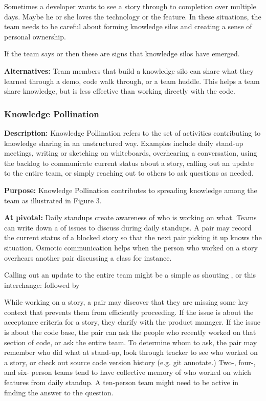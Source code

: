 Sometimes a developer wants to see a story through to completion over multiple days. Maybe he or she loves the technology or the feature. In these situations, the team needs to be careful about forming knowledge silos and creating a sense of personal ownership.

If the team says  or  then these are signs that knowledge silos have emerged. 

\textbf{Alternatives:} Team members that build a knowledge silo can share what they learned through a demo, code walk through, or a team huddle. This helps a team share knowledge, but is less effective than working directly with the code. 

\subsubsection{Knowledge Pollination}
\textbf{Description:} Knowledge Pollination refers to the set of activities contributing to knowledge sharing in an unstructured way. Examples include daily stand-up meetings, writing or sketching on whiteboards, overhearing a conversation, using the backlog to communicate current status about a story, calling out an update to the entire team, or simply reaching out to others to ask questions as needed. 

\textbf{Purpose:} Knowledge Pollination contributes to spreading knowledge among the team as illustrated in Figure 3.

\textbf{At pivotal:} Daily standups create awareness of who is working on what. Teams can write down a  of issues to discuss during daily standups. A pair may record the current status of a blocked story so that the next pair picking it up knows the situation. Osmotic communication helps when the person who worked on a story overhears another pair discussing a class for instance.

Calling out an update to the entire team might be a simple as shouting , or this interchange:   followed by 

While working on a story, a pair may discover that they are missing some key context that prevents them from efficiently proceeding. If the issue is about the acceptance criteria for a story, they clarify with the product manager. If the issue is about the code base, the pair can ask the people who recently worked on that section of code, or ask the entire team.  To determine whom to ask, the pair may remember who did what at stand-up, look through tracker to see who worked on a story, or check out source code version history (e.g. git annotate.) Two-, four-, and six- person teams tend to have collective memory of who worked on which features from daily standup. A ten-person team might need to be active in finding the answer to the question. 

